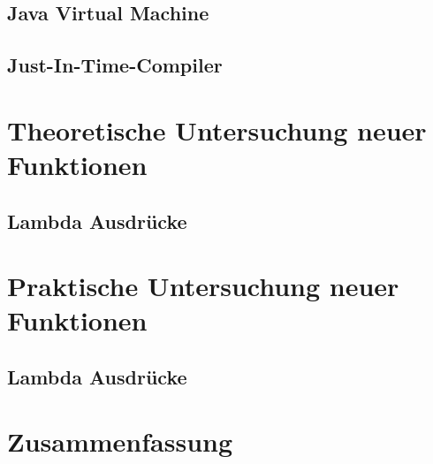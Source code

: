 \section{Java Virtual Machine}
\label{sec:JVM}

\section{Just-In-Time-Compiler}
\label{sec:JIT}



\chapter{Theoretische Untersuchung neuer Funktionen}
\label{sec:Theorie}

\section{Lambda Ausdrücke}
\label{sec:Lambda}

\chapter{Praktische Untersuchung neuer Funktionen}
\label{sec:Praxis}

\section{Lambda Ausdrücke}
\label{sec:Lambda}

\chapter{Zusammenfassung}
\label{sec:Fazit}